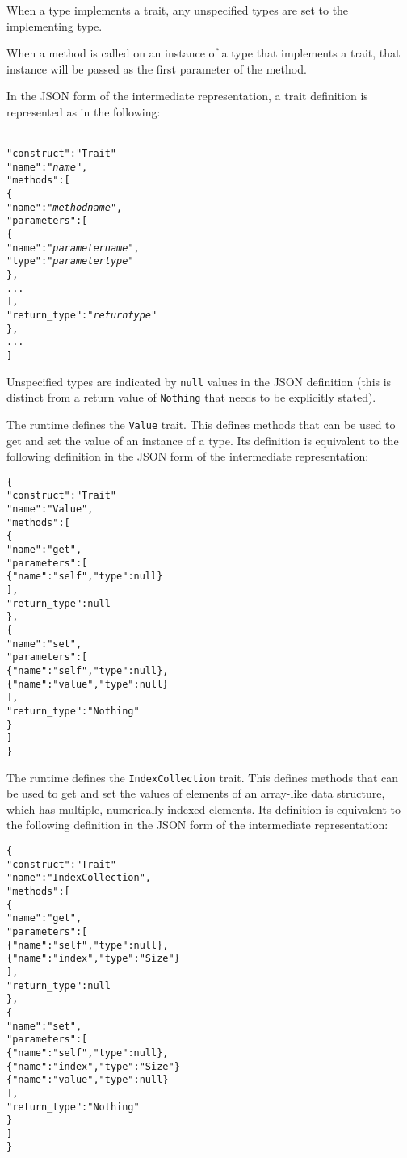 \documentclass[10pt,twocolumn,a4paper]{article}
\newcommand{\code}[1]{\texttt{#1}}
\begin{document}
When a type implements a trait, any unspecified types are set to the
implementing type.

When a method is called on an instance of a type that implements a trait,
that instance will be passed as the first parameter of the method.

In the JSON form of the intermediate representation, a trait definition is
represented as in the following:
\footnotesize
\begin{alltt}
  {
    "construct"   : "Trait"
    "name"        : "\emph{name}",
    "methods"     : [
      \{
        "name"       : "\emph{method name}",
        "parameters" : [
          \{
            "name" : "\emph{parameter name}",
            "type" : "\emph{parameter type}"
          \},
          ...
        ],
        "return\_type" : "\emph{return type}"
      \},
      ...
    ]
  }
\end{alltt}
\normalsize
Unspecified types are indicated by \code{null} values in the JSON definition
(this is distinct from a return value of \code{Nothing} that needs to be
explicitly stated).

The runtime defines the \code{Value} trait. This defines methods
that can be used to get and set the value of an instance of a type. 
Its definition is equivalent to the following definition in the JSON
form of the intermediate representation:
\footnotesize
\begin{alltt}
  \{
    "construct" : "Trait"
    "name"      : "Value",
    "methods"   : [
      \{
        "name"        : "get",
        "parameters"  : [
          \{"name" : "self",  "type"   : null\}
        ],
        "return\_type" : null
      \},
      \{
        "name"        : "set",
        "parameters"  : [
          \{"name" : "self",  "type"   : null\},
          \{"name" : "value", "type"   : null\}
        ],
        "return\_type" : "Nothing"
      \}
    ]
  \}
\end{alltt}
\normalsize

The runtime defines the \code{IndexCollection} trait. This defines methods that can
be used to get and set the values of elements of an array-like data structure, which has
multiple, numerically indexed elements. Its definition is equivalent to the following
definition in the JSON form of the intermediate representation:
\footnotesize
\begin{alltt}
  \{
    "construct" : "Trait"
    "name"      : "IndexCollection",
    "methods"   : [
      \{
        "name"        : "get",
        "parameters"  : [
          \{"name" : "self",  "type"   : null\},
          \{"name" : "index", "type"   : "Size"\}
        ],
        "return\_type" : null
      \},
      \{
        "name"        : "set",
        "parameters"  : [
          \{"name" : "self",  "type"   : null\},
          \{"name" : "index", "type"   : "Size"\}
          \{"name" : "value", "type"   : null\}
        ],
        "return\_type" : "Nothing"
      \}
    ]
  \}
\end{alltt}
\normalsize
\end{document}
